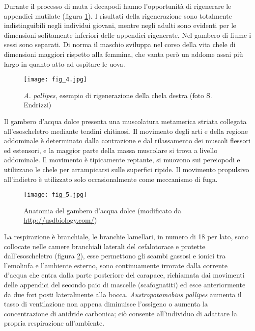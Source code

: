 \documentclass[11pt,a4paper,italian,twoside,openany]{memoir}
\begin{document}
Durante il processo di muta i decapodi hanno l'opportunità di rigenerare le appendici mutilate (figura \ref{fig_4}). I risultati della rigenerazione sono totalmente indistinguibili negli individui giovani, mentre negli adulti sono evidenti per le dimensioni solitamente inferiori delle appendici rigenerate. Nel gambero di fiume i sessi sono separati. Di norma il maschio sviluppa nel corso della vita chele di dimensioni maggiori rispetto alla femmina, che vanta però un addome assai più largo in quanto atto ad ospitare le uova.

\begin{figure}
  \centering
  \texttt{[image: fig\_4.jpg]}
  \caption{\emph{A. pallipes}, esempio di rigenerazione della chela destra (foto S. Endrizzi)}
  \label{fig_4}
\end{figure}


Il gambero d'acqua dolce presenta una muscolatura metamerica striata collegata all'esoscheletro mediante tendini chitinosi. Il movimento degli arti e della regione addominale è determinato dalla contrazione e dal rilassamento dei muscoli flessori ed estensori, e la maggior parte della massa muscolare si trova a livello addominale. Il movimento è tipicamente reptante, si muovono sui pereiopodi e utilizzano le chele per arrampicarsi sulle superfici ripide. Il movimento propulsivo all'indietro è utilizzato solo occasionalmente come meccanismo di fuga.

\begin{figure}
  \centering
  \texttt{[image: fig\_5.jpg]}
  \caption{Anatomia del gambero d'acqua dolce (modificato da \url{http://usdbiology.com/})}
  \label{fig_5}
\end{figure}


La respirazione è branchiale, le branchie lamellari, in numero di 18 per lato, sono collocate nelle camere branchiali laterali del cefalotorace e protette dall'esoscheletro (figura \ref{fig_5}), esse permettono gli scambi gassosi e ionici tra l'emolinfa e l'ambiente esterno, sono continuamente irrorate dalla corrente d'acqua che entra dalla parte posteriore del carapace, richiamata dai movimenti delle appendici del secondo paio di mascelle (scafognatiti) ed esce anteriormente da due fori posti lateralmente alla bocca. \emph{Austropotamobius pallipes} aumenta il tasso di ventilazione non appena diminuisce l'ossigeno o aumenta la concentrazione di anidride carbonica; ciò consente all'individuo di adattare la propria respirazione all'ambiente.
\end{document}
